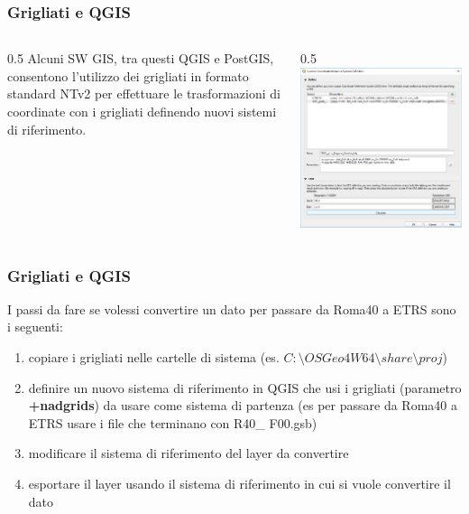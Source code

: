 \documentclass{beamer}
\begin{document}
{\begin{frame}
\frametitle{Grigliati e QGIS}
\begin{columns}	
	\begin{column} {0.5\textwidth}
		Alcuni SW GIS, tra questi QGIS e PostGIS, consentono l'utilizzo dei grigliati in formato standard NTv2 per effettuare le trasformazioni di coordinate con i grigliati definendo nuovi sistemi di riferimento.
	\end{column}		
\begin{column} {0.5\textwidth}
\includegraphics[width=1\textwidth] {./pics/grigliati.png}	
\end{column}		
\end{columns}		
\end{frame}


\begin{frame}
	\frametitle{Grigliati e QGIS}
	I passi da fare se volessi convertire un dato per passare da Roma40 a ETRS sono i seguenti:
	\begin{enumerate}
		\item copiare i grigliati nelle cartelle di sistema (es. $ C:\setminus OSGeo4W64\setminus share\setminus proj $)
		\item definire un nuovo sistema di riferimento in QGIS che usi i grigliati (parametro \textbf{+nadgrids}) da usare come sistema di partenza (es per passare da Roma40 a ETRS usare i file che terminano con R40\_ F00.gsb)
		\item modificare il sistema di riferimento del layer da convertire
		\item esportare il layer usando il sistema di riferimento in cui si vuole convertire il dato 
	\end{enumerate}


\end{frame}}
\end{document}
